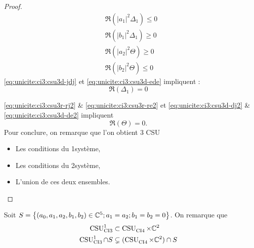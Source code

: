 \begin{proof}
\begin{minipage}{0.49\textwidth}
\begin{align}
        \label{eq:unicite:ci3:csu3d-jdj}&\Re\left(|a_1|^2\Delta_1\right) \le 0 \\
        \label{eq:unicite:ci3:csu3d-ede}&\Re\left(|b_1|^2\Delta_1\right) \ge 0 \\
        \label{eq:unicite:ci3:csu3d-dj2}&\Re\left(|a_2|^2\Theta\right)\ge 0\\
        \label{eq:unicite:ci3:csu3d-de2}&\Re\left(|b_2|^2\Theta\right)\le 0
      \end{align}
      \eqref{eq:unicite:ci3:csu3d-jdj} et \eqref{eq:unicite:ci3:csu3d-ede} impliquent :
      \begin{equation}
        \Re\left(\Delta_1\right) = 0
      \end{equation}
    \end{minipage}

   \eqref{eq:unicite:ci3:csu3r-rj2} \& \eqref{eq:unicite:ci3:csu3r-re2} et \eqref{eq:unicite:ci3:csu3d-dj2} \& \eqref{eq:unicite:ci3:csu3d-de2} impliquent
    \begin{equation}
      \Re\left(\Theta\right) = 0.
    \end{equation}
    Pour conclure, on remarque que l'on obtient 3 CSU
    \begin{itemize}
      \item Les conditions du 1\ier système,
      \item Les conditions du 2\ieme système,
      \item L'union de ces deux ensembles.
    \end{itemize}
  \end{proof}

  Soit \(S = \left\lbrace (a_0,a_1,a_2,b_1,b_2) \in \CC^5 ; a_1 = a_2 ; b_1 = b_2 = 0 \right\rbrace \). On remarque que
  \begin{align}
    \CSU[1]{CI3} & \subset \CSU{CI4}\times\CC^2
    \\
    \CSU[1]{CI3}\cap S & \subsetneq (\CSU{CI4}\times\CC^2)\cap S 
  \end{align}

